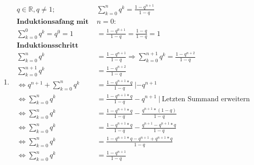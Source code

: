 \documentclass{article}
\begin{document}
\begin{enumerate}[label = (\alph*)]
            \item
                \begin{align*}
                    q \in \mathbb{R}, q \neq 1; \: & \sum_{k=0}^{n} q^k = \frac{1-q^{n+1}}{1-q} \\
                    \textbf{Induktionsafang mit } & n=0: \\
                    \sum_{k=0}^{0} q^k = q^0 = 1 & = \frac{1-q^{0+1}}{1-q} = \frac{1-q}{1-q} = 1 \\
                    \textbf{Induktionsschritt} & \\
                    \sum_{k=0}^{n} q^k & = \frac{1-q^{n+1}}{1-q} \Rightarrow \sum_{k=0}^{n+1} q^k = \frac{1-q^{n+2}}{1-q} \\
                    \sum_{k=0}^{n+1} q^k &= \frac{1-q^{n+2}}{1-q} \\
                    \Leftrightarrow q^{n+1} + \sum_{k=0}^{n} q^k &= \frac{1-q^{n+1} * q}{1-q} \: | - q^{n+1} \\
                    \Leftrightarrow \sum_{k=0}^{n} q^k &= \frac{1-q^{n+1} * q}{1-q} - q^{n+1} \: | \: \text{Letzten Summand erweitern}\\
                    \Leftrightarrow \sum_{k=0}^{n} q^k &= \frac{1-q^{n+1} * q}{1-q} - \frac{q^{n+1}*(1-q)}{1-q} \\
                    \Leftrightarrow \sum_{k=0}^{n} q^k &= \frac{1-q^{n+1} * q}{1-q} - \frac{q^{n+1}- q^{n+1} * q}{1-q} \\
                    \Leftrightarrow \sum_{k=0}^{n} q^k &= \frac{1-q^{n+1} * q - q^{n+1} + q^{n+1} * q}{1-q} \\
                    \Leftrightarrow \sum_{k=0}^{n} q^k &= \frac{1 - q^{n+1}}{1-q}
                \end{align*}
                

\end{enumerate}
\end{document}
